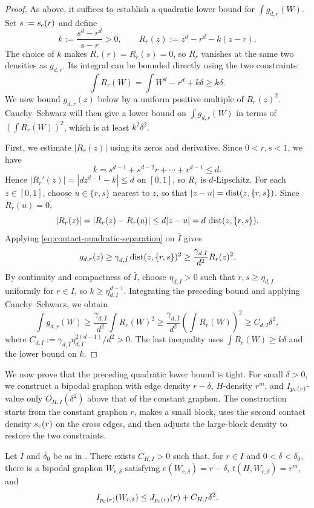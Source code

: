\begin{proof}
As above, it suffices to establish a quadratic lower bound for $\int g_{d,r}(W)$.
Set $s:=\sc(r)$ and define
\[
  k:=\frac{s^d-r^d}{s-r}>0,
  \qquad
  R_r(z):=z^d-r^d-k(z-r).
\]
The choice of $k$ makes $R_r(r)=R_r(s)=0$, so $R_r$ vanishes at the same
two densities as $g_{d,r}$.  Its integral can be bounded directly using the
two constraints:
\[
  \int R_r(W)=\int W^d-r^d+k\delta\ge k\delta.
\]
We now bound $g_{d,r}(z)$ below by a uniform positive multiple of $R_r(z)^2$.
Cauchy--Schwarz will then give a lower bound on $\int g_{d,r}(W)$ in terms of
$\left(\int R_r(W)\right)^2$, which is at least $k^2\delta^2$.

First, we estimate $|R_r(z)|$ using its zeros and derivative.
Since $0<r,s<1$, we have 
\[
  k=s^{d-1}+s^{d-2}r+\cdots+r^{d-1}\le d.
\]
Hence $|R_r'(z)|=|d z^{d-1}-k|\le d$ on $[0,1]$, so $R_r$ is
$d$-Lipschitz.  For each $z\in[0,1]$, choose $u\in\{r,s\}$ nearest to $z$, so that
$|z-u|=\dist(z,\{r,s\})$.  Since $R_r(u)=0$,
\[
  |R_r(z)|=|R_r(z)-R_r(u)|\le d|z-u|
  =d\,\dist(z,\{r,s\}).
\]
Applying \eqref{eq:contact-quadratic-separation} on $\bar I$ gives
\begin{equation*}
  g_{d,r}(z)
  \ge\gamma_{d,\bar I}\dist(z,\{r,s\})^2
  \ge\frac{\gamma_{d,\bar I}}{d^2}R_r(z)^2.
\end{equation*}
By continuity and compactness of $\bar I$, choose $\eta_{d,I}>0$ such that
$r,s\ge\eta_{d,I}$ uniformly for $r\in I$, so $k\ge\eta_{d,I}^{d-1}$.
Integrating the preceding bound and applying Cauchy--Schwarz, we obtain
\begin{equation*}
  \int g_{d,r}(W)
  \ge\frac{\gamma_{d,\bar I}}{d^2}\int R_r(W)^2
  \ge\frac{\gamma_{d,\bar I}}{d^2}\left(\int R_r(W)\right)^2
  \ge C_{d,I}\delta^2,
\end{equation*}
where $C_{d,I}:=\gamma_{d,\bar I}\eta_{d,I}^{2(d-1)}/d^2>0$.
The last inequality uses $\int R_r(W)\ge k\delta$ and the lower bound on $k$.
\end{proof}

We now prove that the preceding quadratic lower bound is tight.
For small $\delta>0$, we construct a bipodal graphon with
edge density $r-\delta$, $H$-density $r^m$, and $I_{\pc(r)}$-value only
$O_{H,I}(\delta^2)$ above that of the constant graphon.  The construction starts
from the constant graphon $r$, makes a small block, uses the second contact density
$\sc(r)$ on the cross edges, and then adjusts the large-block density to
restore the two constraints.

\begin{lemma}\label{lem:quadratic-upper-bound}
  Let $I$ and $\delta_0$ be as in .
There exists $C_{H,I}>0$ such that, for $r\in I$ and $0<\delta<\delta_0$,
there is a bipodal graphon $W_{r,\delta}$ satisfying $e(W_{r,\delta})=r-\delta$,
$t(H,W_{r,\delta})=r^m$, and
\begin{equation}\label{eq:quadratic-upper-bound}
  I_{\pc(r)}(W_{r,\delta})
  \le
  J_{\pc(r)}(r)+C_{H,I}\delta^2.
\end{equation}
\end{lemma}

